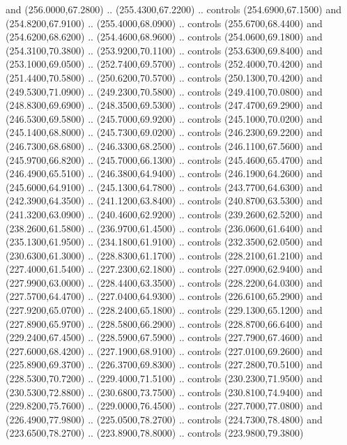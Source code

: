 {\begin{scope}[y=0.80pt, x=0.80pt, yscale=-1, xscale=1, inner sep=0pt, outer sep=0pt, #1]
      and (256.0000,67.2800) .. (255.4300,67.2200) .. controls (254.6900,67.1500)
      and (254.8200,67.9100) .. (255.4000,68.0900) .. controls (255.6700,68.4400)
      and (254.6200,68.6200) .. (254.4600,68.9600) .. controls (254.0600,69.1800)
      and (254.3100,70.3800) .. (253.9200,70.1100) .. controls (253.6300,69.8400)
      and (253.1000,69.0500) .. (252.7400,69.5700) .. controls (252.4000,70.4200)
      and (251.4400,70.5800) .. (250.6200,70.5700) .. controls (250.1300,70.4200)
      and (249.5300,71.0900) .. (249.2300,70.5800) .. controls (249.4100,70.0800)
      and (248.8300,69.6900) .. (248.3500,69.5300) .. controls (247.4700,69.2900)
      and (246.5300,69.5800) .. (245.7000,69.9200) .. controls (245.1000,70.0200)
      and (245.1400,68.8000) .. (245.7300,69.0200) .. controls (246.2300,69.2200)
      and (246.7300,68.6800) .. (246.3300,68.2500) .. controls (246.1100,67.5600)
      and (245.9700,66.8200) .. (245.7000,66.1300) .. controls (245.4600,65.4700)
      and (246.4900,65.5100) .. (246.3800,64.9400) .. controls (246.1900,64.2600)
      and (245.6000,64.9100) .. (245.1300,64.7800) .. controls (243.7700,64.6300)
      and (242.3900,64.3500) .. (241.1200,63.8400) .. controls (240.8700,63.5300)
      and (241.3200,63.0900) .. (240.4600,62.9200) .. controls (239.2600,62.5200)
      and (238.2600,61.5800) .. (236.9700,61.4500) .. controls (236.0600,61.6400)
      and (235.1300,61.9500) .. (234.1800,61.9100) .. controls (232.3500,62.0500)
      and (230.6300,61.3000) .. (228.8300,61.1700) .. controls (228.2100,61.2100)
      and (227.4000,61.5400) .. (227.2300,62.1800) .. controls (227.0900,62.9400)
      and (227.9900,63.0000) .. (228.4400,63.3500) .. controls (228.2200,64.0300)
      and (227.5700,64.4700) .. (227.0400,64.9300) .. controls (226.6100,65.2900)
      and (227.9200,65.0700) .. (228.2400,65.1800) .. controls (229.1300,65.1200)
      and (227.8900,65.9700) .. (228.5800,66.2900) .. controls (228.8700,66.6400)
      and (229.2400,67.4500) .. (228.5900,67.5900) .. controls (227.7900,67.4600)
      and (227.6000,68.4200) .. (227.1900,68.9100) .. controls (227.0100,69.2600)
      and (225.8900,69.3700) .. (226.3700,69.8300) .. controls (227.2800,70.5100)
      and (228.5300,70.7200) .. (229.4000,71.5100) .. controls (230.2300,71.9500)
      and (230.5300,72.8800) .. (230.6800,73.7500) .. controls (230.8100,74.9400)
      and (229.8200,75.7600) .. (229.0000,76.4500) .. controls (227.7000,77.0800)
      and (226.4900,77.9800) .. (225.0500,78.2700) .. controls (224.7300,78.4800)
      and (223.6500,78.2700) .. (223.8900,78.8000) .. controls (223.9800,79.3800)

\end{scope}}

